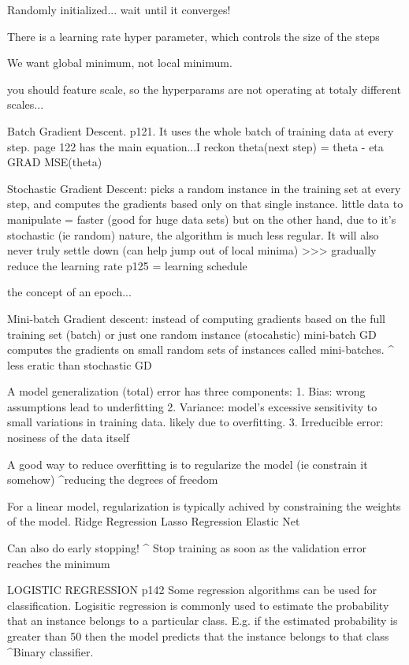 Randomly initialized... wait until it converges!

There is a learning rate hyper parameter, which controls the size of the steps

We want global minimum, not local minimum.

you should feature scale, so the hyperparams are not operating at totaly different scales...

Batch Gradient Descent. p121.
It uses the whole batch of training data at every step.
page 122 has the main equation...I reckon
theta(next step) = theta - eta GRAD MSE(theta)

Stochastic Gradient Descent:
picks a random instance in the training set at every step,
and computes the gradients based only on that single instance.
little data to manipulate = faster (good for huge data sets)
but on the other hand,
due to it's stochastic (ie random) nature,
the algorithm is much less regular.
It will also never truly settle down (can help jump out of local minima)
>>> gradually reduce the learning rate p125 = learning schedule

the concept of an epoch...

Mini-batch Gradient descent:
instead of computing gradients based on the full training set (batch)
or just one random instance (stocahstic)
mini-batch GD computes the gradients on small random sets of instances called mini-batches.
^ less eratic than stochastic GD

A model generalization (total) error has three components:
1. Bias: wrong assumptions lead to underfitting
2. Variance: model's excessive sensitivity to small variations in training data. likely due to overfitting.
3. Irreducible error: nosiness of the data itself


A good way to reduce overfitting is to regularize the model (ie constrain it somehow)
^reducing the degrees of freedom

For a linear model, regularization is typically achived by constraining the weights of the model.
Ridge Regression
Lasso Regression
Elastic Net

Can also do early stopping!
^ Stop training as soon as the validation error reaches the minimum

LOGISTIC REGRESSION p142
Some regression algorithms can be used for classification.
Logisitic regression is commonly used to estimate the probability that
an instance belongs to a particular class.
E.g. if the estimated probability is greater than 50%
then the model predicts that the instance belongs to that class
^Binary classifier.

